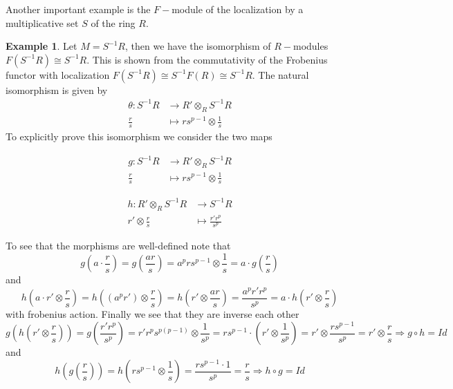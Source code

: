 \documentclass[leqno]{article}
\theoremstyle{definition}
\newtheorem{example}{Example}[section]
\begin{document}
Another important example is the $F-$module of the localization by a multiplicative set $S$ of the ring $R$.

\begin{example} Let  $M=S ^{-1}R$, then we have the isomorphism of $R-$modules $F(S^{-1}R)\cong S^{-1}R$. This is shown from the commutativity of the Frobenius functor with localization $F(S^{-1}R)\cong S^{-1}F(R)\cong S^{-1}R$. The natural isomorphism is given by
   \begin{align*}
	\theta : S ^{-1}R & \to R'\otimes _R S ^{-1}R\\
	\frac{r}{s} &\mapsto rs ^{p-1} \otimes \frac{1}{s}
   \end{align*}
To explicitly prove this isomorphism we consider the two maps

\begin{minipage}{0.5\textwidth}
   \begin{align*}
	g : S ^{-1}R & \to R'\otimes _R S ^{-1}R\\
	\frac{r}{s} &\mapsto rs ^{p-1} \otimes \frac{1}{s}
   \end{align*}
\end{minipage}
\begin{minipage}{0.5\textwidth}
   \begin{align*}
	 h : R'\otimes _R S ^{-1}R & \to  S^{-1}R\\
	 r' \otimes \frac{r}{s} & \mapsto \frac{r'r^p}{s^p}
   \end{align*}
\end{minipage}

To see that the morphisms are well-defined note that
\[
g\left(a \cdot \frac{r}{s}\right) = g\left(\frac{ar}{s}\right) = a^prs ^{p-1} \otimes \frac{1}{s} = a \cdot g\left(\frac{r}{s}\right)
\] 
and 
\[
h\left(a \cdot r'\otimes \frac{r}{s}\right) = h\left(\left(a^pr'\right)\otimes \frac{r}{s}\right) = h\left(r'\otimes \frac{ar}{s}\right) = \frac{a^pr'r^p}{s^p} = a\cdot h\left(r'\otimes \frac{r}{s}\right)
\] 
with frobenius action. Finally we see that they are inverse each other
\[
  g\left(h\left(r'\otimes \frac{r}{s}\right)\right) = g\left(\frac{r'r^p}{s^p}\right) = r'r^p s ^{p\left({p-1}\right)} \otimes \frac{1}{s^p} = rs^{p-1} \cdot \left(r' \otimes \frac{1}{s^p}\right) = r' \otimes \frac{rs ^{p-1}}{s^p} = r' \otimes \frac{r}{s} \Rightarrow g\circ h = Id
\] 
and 
\[
h\left( g \left( \frac{r}{s} \right)  \right) = h \left( rs ^{p-1} \otimes \frac{1}{s} \right) = \frac{rs ^{p-1}\cdot 1}{s^p} = \frac{r}{s} \Rightarrow h\circ g = Id
\] 
\end{example}
\end{document}
